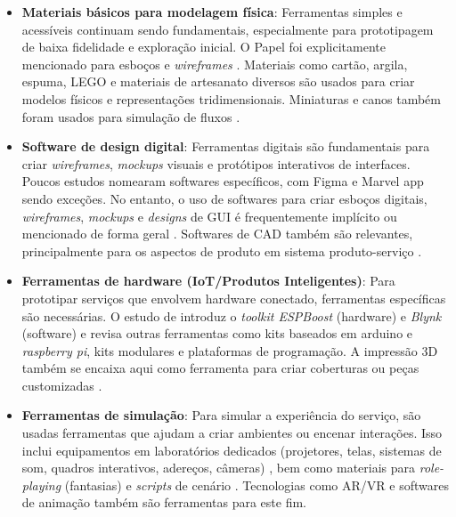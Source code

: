 \begin{itemize}
	\item \textbf{Materiais básicos para modelagem física}: Ferramentas simples e acessíveis continuam sendo fundamentais, especialmente para prototipagem de baixa fidelidade e exploração inicial. O Papel foi explicitamente mencionado para esboços e \textit{wireframes} \cite{villa2022integratedcare, asbjornsen2022echange, Suryawati2024}. Materiais como cartão, argila, espuma, LEGO \cite{wang2023smartproducts, lee2023industry} e materiais de artesanato diversos \cite{seko2024transitions} são usados para criar modelos físicos e representações tridimensionais. Miniaturas e canos também foram usados para simulação de fluxos \cite{lee2023industry}.
	
	\item \textbf{Software de design digital}: Ferramentas digitais são fundamentais para criar \textit{wireframes}, \textit{mockups} visuais e protótipos interativos de interfaces. Poucos estudos nomearam softwares específicos, com Figma \cite{villa2022integratedcare} e Marvel app \cite{asbjornsen2022echange} sendo exceções. No entanto, o uso de softwares para criar esboços digitais, \textit{wireframes}, \textit{mockups} e \textit{designs} de GUI é frequentemente implícito ou mencionado de forma geral \cite{wang2023smartproducts, hegemann2024palette, nguyen2022human, lee2023industry, milton2021eatingdisorders, Suryawati2024}. Softwares de CAD também são relevantes, principalmente para os aspectos de produto em sistema produto-serviço \cite{wang2023smartproducts, quintero2021interdisciplinary, paust2025integrative}.
	
	\item \textbf{Ferramentas de hardware (IoT/Produtos Inteligentes)}: Para prototipar serviços que envolvem hardware conectado, ferramentas específicas são necessárias. O estudo de  introduz o \textit{toolkit ESPBoost} (hardware) e \textit{Blynk} (software) e revisa outras ferramentas como kits baseados em arduino e \textit{raspberry pi}, kits modulares e plataformas de programação. A impressão 3D também se encaixa aqui como ferramenta para criar coberturas ou peças customizadas \cite{wang2023smartproducts, quintero2021interdisciplinary, paust2025integrative}.
	
	\item \textbf{Ferramentas de simulação}: Para simular a experiência do serviço, são usadas ferramentas que ajudam a criar ambientes ou encenar interações. Isso inclui equipamentos em laboratórios dedicados (projetores, telas, sistemas de som, quadros interativos, adereços, câmeras) \cite{soto2023prototyping, yan2022pssvalue}, bem como materiais para \textit{role-playing} (fantasias) \cite{seko2024transitions} e \textit{scripts} de cenário \cite{seko2024transitions}. Tecnologias como AR/VR \cite{wang2023smartproducts, lee2022how, paust2025integrative} e softwares de animação \cite{lee2023industry, mager2023product} também são ferramentas para este fim.
	

\end{itemize}
